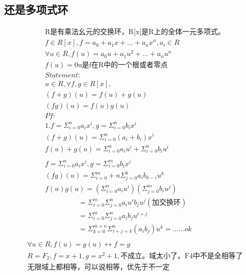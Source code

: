 \documentclass[12pt, a4paper]{article}  %
\begin{document}
\subsection{还是多项式环}
\begin{align}
    &\text{R是有乘法幺元的交换环，R[x]是R上的全体一元多项式。}\\
    &f\in R[x],f=a_0+a_1x+...+a_nx^n,a_i\in R\\
    &\forall u\in R,f(u)=a_0u+a_1u^2+...+a_nu^n\\
    &f(u)=0\text{u是f在R中的一个根或者零点}\\
    &Statement:\\
    &u\in R,\forall f,g\in R[x],\\
    &(f+g)(u)=f(u)+g(u)\\
    &(fg)(u)=f(u)g(u)\\
    &Pf:\\
    &1.f=\Sigma_{i=0}^n a_i x^i,g=\Sigma_{i=0}^n b_i x^i\\
    &(f+g)(u)=\Sigma_{i=0}^n (a_i+b_i) x^i\\
    &f(u)+g(u)=\Sigma_{i=0}^n a_iu^i+\Sigma_{i=0}^n b_iu^i\\
    & \\
    &f=\Sigma_{i=0}^n a_i x^i,g=\Sigma_{i=0}^m b_i x^i\\
    &(fg)(u)=\Sigma_{i=0}^m+n \Sigma_{j=0}^k a_ib_{k-i} u^{k}\\
    &f(u)g(u)=(\Sigma_{i=0}^n a_iu^i)(\Sigma_{j=0}^m b_iu^j)
\end{align}
\begin{align}
    &=\Sigma_{i=0}^m \Sigma_{j=0}^n a_iu^i b_{j} u^j(\text{加交换环})\\
    &=\Sigma_{i=0}^m \Sigma_{j=0}^n a_ib_j u^{i+j}\\
    &=\Sigma_{k=0}^{m+n} \Sigma_{i+j=k}^n (a_ib_{j}) u^{k}=...... ok\\
\end{align}
\begin{align}
    &\forall u\in R,f(u)=g(u)\leftrightarrow f=g\\
    &R=F_2,f=x+1,g=x^2+1,\text{不成立。域太小了。F4中不是全相等了}\\
    &\text{无限域上都相等，可以说相等，优先于不一定}
\end{align}
\end{document}
